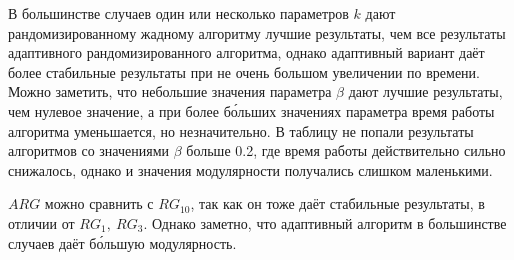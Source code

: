 В большинстве случаев один или несколько параметров $k$ дают рандомизированному жадному алгоритму лучшие результаты, чем все результаты адаптивного рандомизированного алгоритма, однако адаптивный вариант даёт более стабильные результаты при не очень большом увеличении по времени. Можно заметить, что небольшие значения параметра $\beta$ дают лучшие результаты, чем нулевое значение, а при более б\'{о}льших значениях параметра время работы алгоритма уменьшается, но незначительно. В таблицу не попали результаты алгоритмов со значениями $\beta$ больше 0.2, где время работы действительно сильно снижалось, однако и значения модулярности получались слишком маленькими.

$ARG$ можно сравнить с $RG_{10}$, так как он тоже даёт стабильные результаты, в отличии от $RG_{1},\ RG_{3}$. Однако заметно, что адаптивный алгоритм в большинстве случаев даёт б\'{о}льшую модулярность.